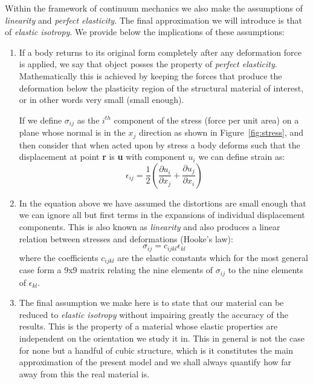 Within the framework of continuum mechanics we also make the assumptions of \textit{linearity} and \textit{perfect elasticity}. The final approximation we will introduce is that of \textit{elastic isotropy}. We provide below the implications of these assumptions:
\begin{enumerate}
\item If a body returns to its original form completely after any deformation force is applied, we say that object posses the property of \textit{perfect elasticity}. Mathematically this is achieved by keeping the forces that produce the deformation below the plasticity region of the structural material of interest, or in other words very small (small enough).

If we define $\sigma_{ij}$ as the $i^{th}$ component of the stress (force per unit area) on a plane whose normal is in the $x_{j}$ direction as shown in Figure~\ref{fig:stress}, and then consider that when acted upon by stress a body deforms such that the displacement at point \textbf{r} is \textbf{u} with component $u_{i}$ we can define strain as:
\begin{equation}
\epsilon_{ij}=\dfrac{1}{2}\left(\dfrac{\partial u_i}{\partial x_j} + \dfrac{\partial u_j}{\partial x_i}\right)
\end{equation}

\item In the equation above we have assumed the distortions are small enough that we can ignore all but first terms in the expansions of individual displacement components. This is also known as \textit{linearity} and also produces a linear relation between stresses and deformations (Hooke's law):
\begin{equation}
\sigma_{ij}=c_{ijkl}\epsilon_{kl}
\end{equation}
where the coefficients $c_{ijkl}$ are the elastic constants which for the most general case form a 9x9 matrix relating the nine elements of $\sigma_{ij}$ to the nine elements of $\epsilon_{kl}$.

\item The final assumption we make here is to state that our material can be reduced to \textit{elastic isotropy} without impairing greatly the accuracy of the results. This is the property of a material whose elastic properties are independent on the orientation we study it in. This in general is not the case for none but a handful of cubic structure, which is it constitutes the main approximation of the present model and we shall always quantify how far away from this the real material is.
\end{enumerate}

